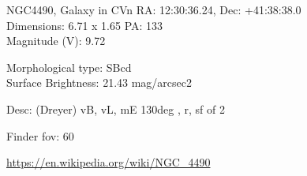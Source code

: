 \begin{block}{NGC4490, Galaxy in CVn}
    RA: 12:30:36.24, Dec: +41:38:38.0 \\ 
    Dimensions: 6.71 x 1.65 PA: 133 \\ 
    Magnitude (V): 9.72

    Morphological type: SBcd \\ 
    Surface Brightness: 21.43 mag/arcsec2 

    Desc: (Dreyer) vB, vL, mE 130deg , r, sf of 2 

    Finder fov: 60 

    \url{https://en.wikipedia.org/wiki/NGC_4490} 
\end{block}
